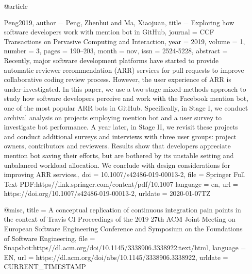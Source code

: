 {{{{@article{Peng2019,
  author   = {Peng, Zhenhui and Ma, Xiaojuan},
  title    = {Exploring how software developers work with mention bot in {GitHub}},
  journal  = {CCF Transactions on Pervasive Computing and Interaction},
  year     = {2019},
  volume   = {1},
  number   = {3},
  pages    = {190--203},
  month    = nov,
  issn     = {2524-5228},
  abstract = {Recently, major software development platforms have started to provide automatic reviewer recommendation (ARR) services for pull requests to improve collaborative coding review process. However, the user experience of ARR is under-investigated. In this paper, we use a two-stage mixed-methods approach to study how software developers perceive and work with the Facebook mention bot, one of the most popular ARR bots in GitHub. Specifically, in Stage I, we conduct archival analysis on projects employing mention bot and a user survey to investigate bot performance. A year later, in Stage II, we revisit these projects and conduct additional surveys and interviews with three user groups: project owners, contributors and reviewers. Results show that developers appreciate mention bot saving their efforts, but are bothered by its unstable setting and unbalanced workload allocation. We conclude with design considerations for improving ARR services.},
  doi      = {10.1007/s42486-019-00013-2},
  file     = {Springer Full Text PDF:https\://link.springer.com/content/pdf/10.1007%
  language = {en},
  url      = {https://doi.org/10.1007/s42486-019-00013-2},
  urldate  = {2020-01-07TZ}
}

@misc{,
  title    = {A conceptual replication of continuous integration pain points in the context of {Travis} {CI} {\textbar} {Proceedings} of the 2019 27th {ACM} {Joint} {Meeting} on {European} {Software} {Engineering} {Conference} and {Symposium} on the {Foundations} of {Software} {Engineering}},
  file     = {Snapshot:https\://dl.acm.org/doi/10.1145/3338906.3338922:text/html},
  language = {EN},
  url      = {https://dl.acm.org/doi/abs/10.1145/3338906.3338922},
  urldate  = {CURRENT\_TIMESTAMP}
}

}}}}}
